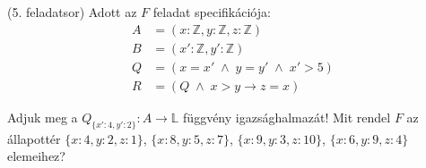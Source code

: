 \documentclass[a4paper,12pt]{article}
\theoremstyle{definition}
\begin{document}
    \newpage
    \setcounter{question}{2}
    \begin{question}(5. feladatsor)
        Adott az $F$ feladat specifikációja:
        \begin{align*}
            A &= (x: \mathbb{Z}, y: \mathbb{Z}, z: \mathbb{Z}) \\
            B &= (x': \mathbb{Z}, y': \mathbb{Z}) \\
            Q &= (x = x' \; \land \; y = y' \; \land \; x' > 5) \\
            R &= (Q \; \land \; x > y \rightarrow z = x)
        \end{align*}
        \begin{tasks}
            \task Adjuk meg a $Q_{\{x':4, y':2\}}: A \rightarrow \mathbb{L} $ függvény igazsághalmazát!
            \task Mit rendel $F$ az állapottér $ \{ x:4,y:2,z:1 \} $, $ \{ x:8,y:5,z:7 \} $, $ \{ x:9,y:3,z:10 \} $, $ \{ x:6,y:9,z:4 \} $ elemeihez?
        \end{tasks}
    \end{question}
\end{document}
